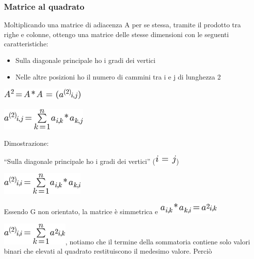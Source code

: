 \documentclass{article}
\providecommand{\tightlist}{%
  \setlength{\itemsep}{0pt}\setlength{\parskip}{0pt}}
\begin{document}
{{{\hypertarget{h.md5vuljp7xm}{\subsubsection{\texorpdfstring{{Matrice al
quadrato}}{Matrice al quadrato}}\label{h.md5vuljp7xm}}

{}

{Moltiplicando una matrice di adiacenza A per se stessa, tramite il
prodotto tra righe e colonne, ottengo una matrice delle stesse
dimensioni con le seguenti caratteristiche:}

\begin{itemize}
\tightlist
\item
  {Sulla diagonale principale ho i gradi dei vertici}
\item
  {Nelle altre posizioni ho il numero di cammini tra i e j di lunghezza
  2}
\end{itemize}

{}

\includegraphics{images/image408.png}

\includegraphics{images/image409.png}

{}

{Dimostrazione}{:}

{``Sulla diagonale principale ho i gradi dei vertici''
(}\includegraphics{images/image410.png}{)}

\includegraphics{images/image411.png}

{Essendo G non orientato, la matrice è simmetrica e
}\includegraphics{images/image412.png}

\includegraphics{images/image413.png}{, notiamo che il termine della
sommatoria contiene solo valori binari che elevati al quadrato
restituiscono il medesimo valore. Perciò}

}}}
\end{document}
